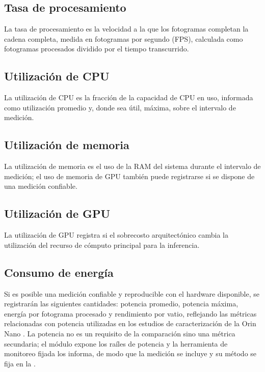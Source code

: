 \subsection{Tasa de procesamiento}

La tasa de procesamiento es la velocidad a la que los fotogramas completan
la cadena completa, medida en fotogramas por segundo (FPS), calculada como
fotogramas procesados dividido por el tiempo transcurrido.

\subsection{Utilización de CPU}

La utilización de CPU es la fracción de la capacidad de CPU en uso,
informada como utilización promedio y, donde sea útil, máxima, sobre el
intervalo de medición.

\subsection{Utilización de memoria}

La utilización de memoria es el uso de la RAM del sistema durante el
intervalo de medición; el uso de memoria de GPU también puede registrarse si
se dispone de una medición confiable.

\subsection{Utilización de GPU}

La utilización de GPU registra si el sobrecosto arquitectónico cambia la
utilización del recurso de cómputo principal para la inferencia.

\subsection{Consumo de energía}

Si es posible una medición confiable y reproducible con el hardware
disponible, se registrarán las siguientes cantidades: potencia promedio,
potencia máxima, energía por fotograma procesado y rendimiento por vatio,
reflejando las métricas relacionadas con potencia utilizadas en los estudios
de caracterización de la Orin Nano \cite{tang2026}. La potencia no es un
requisito de la comparación sino una métrica secundaria; el módulo
expone los raíles de potencia y la herramienta de monitoreo fijada los
informa, de modo que la medición se incluye y su método se fija en la
 \cite{nvidiacorporation2026potencia,
nvidiacorporation2026tegrastats}.

